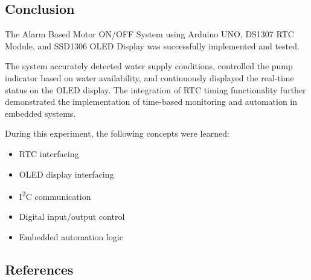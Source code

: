 \subsection{Conclusion}

The Alarm Based Motor ON/OFF System using Arduino UNO, DS1307 RTC Module, and SSD1306 OLED Display was successfully implemented and tested.

The system accurately detected water supply conditions, controlled the pump indicator based on water availability, and continuously displayed the real-time status on the OLED display. The integration of RTC timing functionality further demonstrated the implementation of time-based monitoring and automation in embedded systems.

During this experiment, the following concepts were learned:

\begin{itemize}

\item RTC interfacing

\item OLED display interfacing

\item I\textsuperscript{2}C communication

\item Digital input/output control

\item Embedded automation logic

\end{itemize}


\subsection{References}

